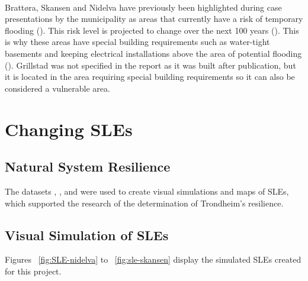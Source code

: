 \paragraph{}

\paragraph{}
Brattøra, Skansen and Nidelva have previously been highlighted during case presentations by the municipality as areas that currently have a risk of temporary flooding (\cite{hanssen_saksframlegg_2013}). This risk level is projected to change over the next 100 years (\cite{hanssen-bauer_climate_2017}). This is why these areas have special building requirements such as water-tight basements and keeping electrical installations above the area of potential flooding (\cite{hanssen_saksframlegg_2013}). Grillstad was not specified in the report as it was built after publication, but it is located in the area requiring special building requirements so it can also be considered a vulnerable area. 

\section{Changing SLEs}




\subsection{ Natural System Resilience}

The datasets  \cite{geonorge_stormflo_2021} , \cite{kartverket_se_2021}, \cite{stormflo_database_stormflo_2021} and \cite{ipcc_sea_2021} were used to create visual simulations and maps of SLEs, which supported the research of the determination of Trondheim's resilience. 

\subsection{Visual Simulation of SLEs} \label{visual-simulations}
 Figures ~\ref{fig:SLE-nidelva} to ~\ref{fig:sle-skansen} display the simulated SLEs created for this project. 

